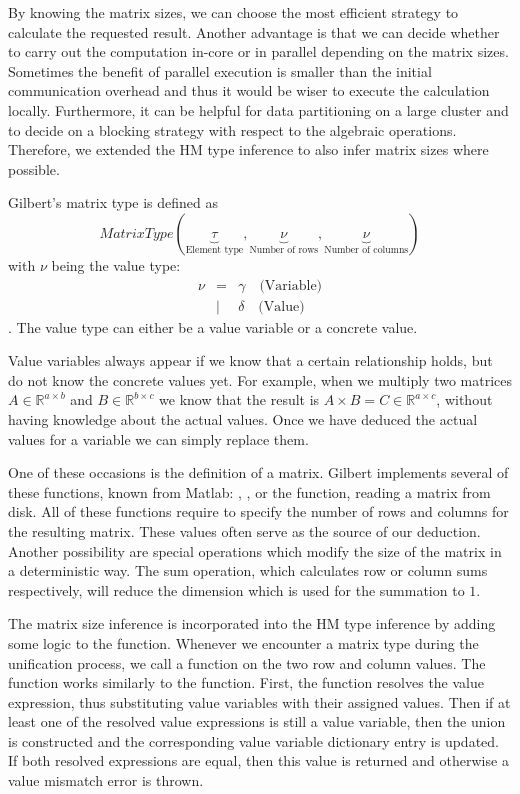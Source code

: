 By knowing the matrix sizes, we can choose the most efficient strategy to calculate the requested result.
Another advantage is that we can decide whether to carry out the computation in-core or in parallel depending on the matrix sizes.
Sometimes the benefit of parallel execution is smaller than the initial communication overhead and thus it would be wiser to execute the calculation locally.
Furthermore, it can be helpful for data partitioning on a large cluster and to decide on a blocking strategy with respect to the algebraic operations.
Therefore, we extended the HM type inference to also infer matrix sizes where possible.

Gilbert's matrix type is defined as 
\begin{displaymath}
MatrixType(\underbrace{\tau}_{\text{Element type}},\underbrace{\nu}_{\text{Number of rows}},\underbrace{\nu}_{\text{Number of columns}})
\end{displaymath}
with $\nu$ being the value type:
\begin{eqnarray*}
	\nu &=& \gamma\quad\text{(Variable)} \\
	&|& \delta\quad\text{(Value)}
\end{eqnarray*}
.
The value type can either be a value variable or a concrete value.

Value variables always appear if we know that a certain relationship holds, but do not know the concrete values yet.
For example, when we multiply two matrices $A\in\mathbb{R}^{a\times b}$ and $B\in\mathbb{R}^{b\times c}$ we know that the result is $A\times B = C \in \mathbb{R}^{a\times c}$, without having knowledge about the actual values.
Once we have deduced the actual values for a variable we can simply replace them.

One of these occasions is the definition of a matrix.
Gilbert implements several of these functions, known from Matlab: , ,  or the  function, reading a matrix from disk.
All of these functions require to specify the number of rows and columns for the resulting matrix.
These values often serve as the source of our deduction.
Another possibility are special operations which modify the size of the matrix in a deterministic way.
The sum operation, which calculates row or column sums respectively, will reduce the dimension which is used for the summation to $1$.

The matrix size inference is incorporated into the HM type inference by adding some logic to the  function.
Whenever we encounter a matrix type during the unification process, we call a  function on the two row and column values.
The  function works similarly to the  function.
First, the function resolves the value expression, thus substituting value variables with their assigned values.
Then if at least one of the resolved value expressions is still a value variable, then the union is constructed and the corresponding value variable dictionary entry is updated.
If both resolved expressions are equal, then this value is returned and otherwise a value mismatch error is thrown.